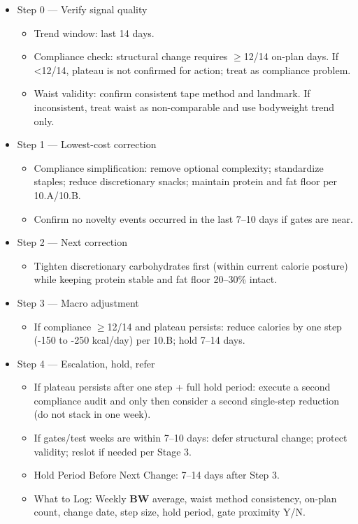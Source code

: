 \documentclass[10pt]{article}
\begin{document}
\begin{itemize}
\item Step 0 — Verify signal quality
  \begin{itemize}
  \item Trend window: last 14 days.
  \item Compliance check: structural change requires $\geq$12/14 on-plan days. If \textless12/14, plateau is not confirmed for action; treat as compliance problem.
  \item Waist validity: confirm consistent tape method and landmark. If inconsistent, treat waist as non-comparable and use bodyweight trend only.
  \end{itemize}
\item Step 1 — Lowest-cost correction
  \begin{itemize}
  \item Compliance simplification: remove optional complexity; standardize staples; reduce discretionary snacks; maintain protein and fat floor per 10.A/10.B.
  \item Confirm no novelty events occurred in the last 7–10 days if gates are near.
  \end{itemize}
\item Step 2 — Next correction
  \begin{itemize}
  \item Tighten discretionary carbohydrates first (within current calorie posture) while keeping protein stable and fat floor 20–30\% intact.
  \end{itemize}
\item Step 3 — Macro adjustment
  \begin{itemize}
  \item If compliance $\geq$12/14 and plateau persists: reduce calories by one step (-150 to -250 kcal/day) per 10.B; hold 7–14 days.
  \end{itemize}
\item Step 4 — Escalation, hold, refer
  \begin{itemize}
  \item If plateau persists after one step + full hold period: execute a second compliance audit and only then consider a second single-step reduction (do not stack in one week).
  \item If gates/test weeks are within 7–10 days: defer structural change; protect validity; reslot if needed per Stage 3.
  \item Hold Period Before Next Change: 7–14 days after Step 3.
  \item What to Log: Weekly \textbf{BW} average, waist method consistency, on-plan count, change date, step size, hold period, gate proximity Y/N.

\end{itemize}
\end{itemize}
\end{document}
